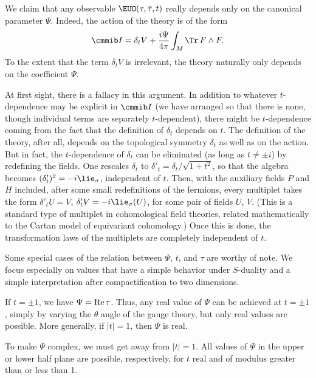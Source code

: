 We claim that any observable ${\EUO}(\tau,\bar\tau,t)$ really
depends only on the canonical parameter $\Psi$. Indeed, the action
of the theory is of the form %
\setcounter{equation}{50}
\begin{equation}\label{eq:juty}
{{\cmmib I}}=\delta_tV
+{i\Psi\over 4\pi }\int_M\Tr \,F\wedge F.
\end{equation}
 To the extent that the
term $\delta_tV$ is irrelevant, the theory naturally only depends
on the coefficient $\Psi$.

At first sight, there is a fallacy in this argument.  In addition
to whatever $t$-dependence may be explicit in ${{\cmmib I}}$ (we
have arranged so that there is none, though individual terms are
separately $t$-dependent), there might be $t$-dependence coming
from the fact that the definition of $\delta_t$ depends on $t$.
The definition of the theory, after all, depends on the
topological symmetry $\delta_t$ as well as on the action. But in
fact, the $t$-dependence of $\delta_t$ can be eliminated (as long
as $t\not=\pm i$) by redefining the fields. One rescales
$\delta_t$ to $\delta'_t=\delta_t/\sqrt{1+t^2}$, so that the
algebra becomes $(\delta'_t)^2=-i{{\lie}}_\sigma$, independent of
$t$. Then,  with the auxiliary fields $P$ and $H$ included, after
some small redefinitions of the fermions, every multiplet takes
the form $\delta'_t U=V$, $\delta'_tV=-i{{\lie}}_\sigma(U)$, for
some pair of fields $U$, $V$.  (This is a standard type of
multiplet in cohomological field theories, related mathematically
to the Cartan model of equivariant cohomology.)  Once this is
done, the transformation laws of the multiplets are completely
independent of $t$.

\par{}

Some special cases of the relation between $\Psi$, $t$, and $\tau$
are worthy of note. We focus especially on values that have a
simple behavior under $S$-duality and a simple interpretation
after compactification to two dimensions.

If $t=\pm 1$, we have $\Psi={\rm Re}\,\tau$.  Thus, any real value
of $\Psi$ can be achieved at $t=\pm 1$, simply by varying the
$\theta$ angle of the gauge theory, but only real values are
possible. More generally, if $|t|=1$, then $\Psi$ is real.

To make $\Psi$ complex, we must get away from $|t|=1$.  All values
of $\Psi$ in the upper or lower half plane are possible,
respectively, for $t$ real and of modulus greater than or less
than 1.

